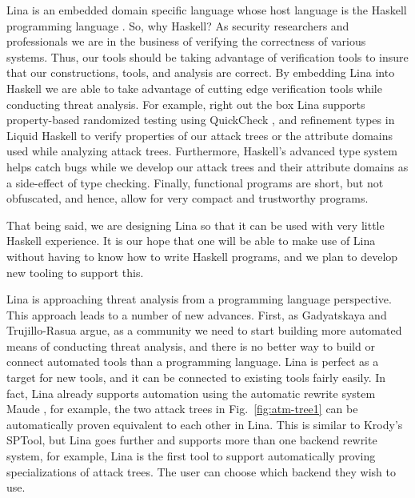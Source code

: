 Lina is an embedded domain specific language whose host language is
the Haskell programming language \cite{jones2003haskell}.  So, why
Haskell?  As security researchers and professionals we are in the
business of verifying the correctness of various systems. Thus, our
tools should be taking advantage of verification tools to insure that
our constructions, tools, and analysis are correct.  By embedding Lina
into Haskell we are able to take advantage of cutting edge
verification tools while conducting threat analysis.  For example,
right out the box Lina supports property-based randomized testing
using QuickCheck \cite{Claessen:2011:QLT:1988042.1988046}, and
refinement types in Liquid Haskell
\cite{Vazou:2014:RTH:2692915.2628161} to verify properties of our
attack trees or the attribute domains used while analyzing attack
trees.  Furthermore, Haskell's advanced type system helps catch bugs
while we develop our attack trees and their attribute domains as a
side-effect of type checking.  Finally, functional programs are short,
but not obfuscated, and hence, allow for very compact and trustworthy
programs.

That being said, we are designing Lina so that it can be used with
very little Haskell experience.  It is our hope that one will be able
to make use of Lina without having to know how to write Haskell
programs, and we plan to develop new tooling to support this.

Lina is approaching threat analysis from a programming language
perspective.  This approach leads to a number of new advances.  First,
as Gadyatskaya and Trujillo-Rasua \cite{10.1007/978-3-319-74860-3_9}
argue, as a community we need to start building more automated means
of conducting threat analysis, and there is no better way to build or
connect automated tools than a programming language.  Lina is perfect
as a target for new tools, and it can be connected to existing tools
fairly easily.  In fact, Lina already supports automation using the
automatic rewrite system Maude \cite{clavel2005maude}, for example,
the two attack trees in Fig.~\ref{fig:atm-tree1} can be automatically
proven equivalent to each other in Lina.  This is similar to Krody's
\cite{Kordy2017} SPTool, but Lina goes further and supports more than
one backend rewrite system, for example, Lina is the first tool to
support automatically proving specializations of attack trees.  The
user can choose which backend they wish to use.

